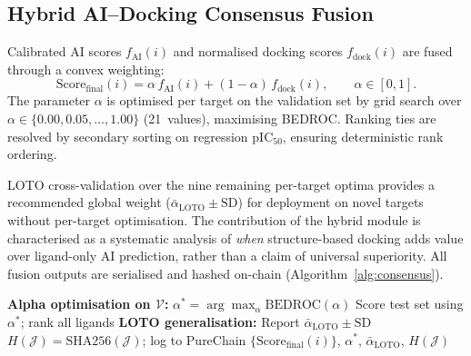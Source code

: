 \documentclass[conference]{IEEEtran}
\begin{document}
\subsection{\textbf{Hybrid AI--Docking Consensus Fusion}}
\label{sec:fusion}

Calibrated AI scores $f_{\mathrm{AI}}(i)$ and normalised
docking scores $f_{\mathrm{dock}}(i)$ are fused through
a convex weighting:
\begin{equation}
\label{eq:hybrid}
\mathrm{Score}_{\mathrm{final}}(i)
  = \alpha \, f_{\mathrm{AI}}(i)
  + (1 - \alpha)\, f_{\mathrm{dock}}(i),
\qquad \alpha \in [0, 1].
\end{equation}
The parameter $\alpha$ is optimised per target on the
validation set by grid search over
$\alpha \in \{0.00, 0.05, \ldots, 1.00\}$ (21~values),
maximising BEDROC.
Ranking ties are resolved by secondary sorting on
regression pIC$_{50}$, ensuring deterministic rank ordering.

LOTO cross-validation over the
nine remaining per-target optima provides a recommended
global weight ($\bar{\alpha}_{\mathrm{LOTO}} \pm \mathrm{SD}$)
for deployment on novel targets without per-target
optimisation.
The contribution of the hybrid module is characterised
as a systematic analysis of \emph{when} structure-based
docking adds value over ligand-only AI prediction,
rather than a claim of universal superiority.
All fusion outputs are serialised and hashed on-chain
(Algorithm~\ref{alg:consensus}).

\begin{algorithm}[!htbp]
\scriptsize
\caption{Consensus AI--Docking Fusion}
\label{alg:consensus}
\textbf{Alpha optimisation on $\mathcal{V}$:}\;
$\alpha^* = \arg\max_\alpha \mathrm{BEDROC}(\alpha)$\;
Score test set using $\alpha^*$; rank all ligands\;
\textbf{LOTO generalisation:}\;
Report $\bar{\alpha}_{\mathrm{LOTO}} \pm \mathrm{SD}$\;
$H(\mathcal{J}) = \mathrm{SHA256}(\mathcal{J})$;
log to PureChain\;
\Return $\{\mathrm{Score}_{\mathrm{final}}(i)\}$,
  $\alpha^*$, $\bar{\alpha}_{\mathrm{LOTO}}$,
  $H(\mathcal{J})$\;
\end{algorithm}
\end{document}
